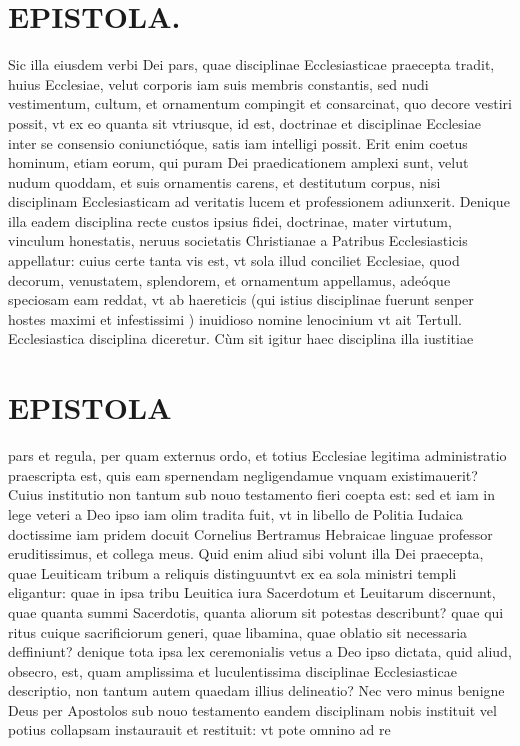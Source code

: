 \documentclass{article}
\begin{document}
\begin{pages}
\section*{EPISTOLA. }\pstart Sic illa eiusdem verbi Dei pars, quae disciplinae Ecclesiasticae praecepta tradit, huius Ecclesiae, velut corporis iam suis membris constantis, sed nudi vestimentum, cultum, et ornamentum compingit et consarcinat, quo decore vestiri possit, vt ex eo quanta sit vtriusque, id est, doctrinae et disciplinae Ecclesiae inter se consensio coniunctióque, satis iam intelligi possit. Erit enim coetus hominum, etiam eorum, qui puram Dei praedicationem amplexi sunt, velut nudum quoddam, et suis ornamentis carens, et destitutum corpus, nisi disciplinam Ecclesiasticam ad veritatis lucem et professionem adiunxerit. Denique illa eadem disciplina recte custos ipsius fidei, doctrinae, mater virtutum, vinculum honestatis, neruus societatis Christianae a Patribus Ecclesiasticis appellatur: cuius certe tanta vis est, vt sola illud conciliet Ecclesiae, quod decorum, venustatem, splendorem, et ornamentum appellamus, adeóque speciosam eam reddat, vt ab haereticis (qui istius disciplinae fuerunt senper hostes maximi et infestissimi ) inuidioso nomine lenocinium vt ait Tertull. Ecclesiastica disciplina diceretur. Cùm sit igitur haec disciplina illa iustitiae  \pend
\section*{EPISTOLA }\pstart pars et regula, per quam externus ordo, et totius Ecclesiae legitima administratio praescripta est, quis eam spernendam negligendamue vnquam existimauerit? Cuius institutio non tantum sub nouo testamento fieri coepta est: sed et iam in lege veteri a Deo ipso iam olim tradita fuit, vt in libello de Politia Iudaica doctissime iam pridem docuit Cornelius Bertramus Hebraicae linguae professor eruditissimus, et collega meus. Quid enim aliud sibi volunt illa Dei praecepta, quae Leuiticam tribum a reliquis distinguuntvt ex ea sola ministri templi eligantur: quae in ipsa tribu Leuitica iura Sacerdotum et Leuitarum discernunt, quae quanta summi Sacerdotis, quanta aliorum sit potestas describunt? quae qui ritus cuique  sacrificiorum generi, quae libamina, quae oblatio sit necessaria deffiniunt? denique tota ipsa lex ceremonialis vetus a Deo ipso dictata, quid aliud, obsecro, est, quam amplissima et luculentissima disciplinae Ecclesiasticae descriptio, non tantum autem quaedam illius delineatio? Nec vero minus benigne Deus per Apostolos sub nouo testamento eandem disciplinam nobis instituit vel potius collapsam instaurauit et restituit: vt pote omnino ad re\pend

\end{pages}
\end{document}
